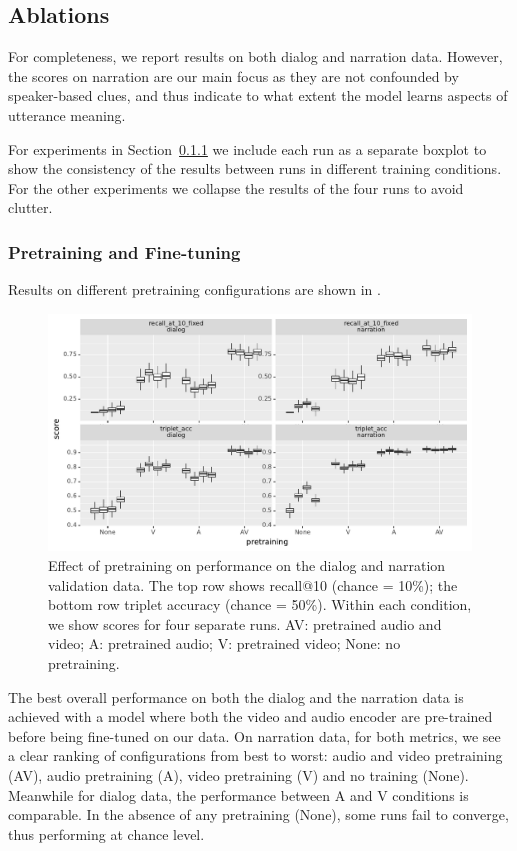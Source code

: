 \subsection{Ablations}
\label{sec:ablations}
For completeness, we report results on both dialog and narration
data. However, the scores on narration are our main focus as they are
not confounded by speaker-based clues, and thus indicate to what
extent the model learns aspects of utterance meaning.

For experiments in Section~\ref{sec:pretraining} we include each run as a separate boxplot
to show the consistency of the results between runs in
different training conditions.  For the other experiments we collapse
the results of the four runs to avoid clutter.

\subsubsection{Pretraining and Fine-tuning}
\label{sec:pretraining}

Results on different pretraining configurations are shown in
.
\begin{figure}[htb]
	\centering
	\includegraphics[width=\textwidth]{results/ablations/pretraining.pdf}
	\caption{Effect of pretraining on performance on the dialog
          and narration validation data. The top row shows recall@10
          (chance = 10\%); the bottom row triplet accuracy (chance =
          50\%). Within each condition, we show scores for four
          separate runs. AV: pretrained audio and video; A: pretrained
          audio; V: pretrained video; None: no pretraining.}
	\label{fig:pretraining}
      \end{figure}

The best overall performance on both the dialog and the narration data is 
achieved with a model where both the video and audio encoder are pre-trained 
before being fine-tuned on our data. On narration data, for both metrics,
we see a clear ranking of
configurations from best to worst: audio and video pretraining (AV), 
audio pretraining (A), video pretraining (V) and no training (None). 
Meanwhile for dialog data, the performance between A and V conditions
is comparable. In the absence of any pretraining (None),
some runs fail to converge, thus performing at chance level.

